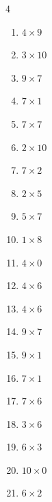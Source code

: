 \begin{multicols}{4}
\begin{enumerate}
  \item $4\times 9$
        \phantom{$=36$}

  \item $3\times 10$
        \phantom{$=30$}

  \item $9\times 7$
        \phantom{$=63$}

  \item $7\times 1$
        \phantom{$=7$}

  \item $7\times 7$
        \phantom{$=49$}

  \item $2\times 10$
        \phantom{$=20$}

  \item $7\times 2$
        \phantom{$=14$}

  \item $2\times 5$
        \phantom{$=10$}

  \item $5\times 7$
        \phantom{$=35$}

  \item $1\times 8$
        \phantom{$=8$}

  \item $4\times 0$
        \phantom{$=0$}

  \item $4\times 6$
        \phantom{$=24$}

\columnbreak %

  \item $4\times 6$
        \phantom{$=24$}

  \item $9\times 7$
        \phantom{$=63$}

  \item $9\times 1$
        \phantom{$=9$}

  \item $7\times 1$
        \phantom{$=7$}

  \item $7\times 6$
        \phantom{$=42$}

  \item $3\times 6$
        \phantom{$=18$}

  \item $6\times 3$
        \phantom{$=18$}

  \item $10\times 0$
        \phantom{$=0$}

  \item $6\times 2$
        \phantom{$=12$}


\end{enumerate}
\end{multicols}

